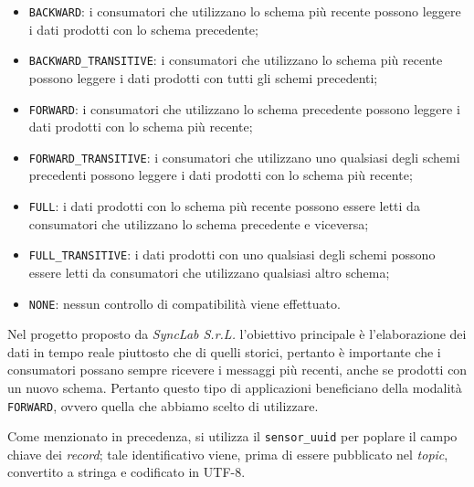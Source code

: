 \begin{itemize}
	\item \texttt{BACKWARD}: i consumatori che utilizzano lo schema più recente possono leggere i dati prodotti con lo schema precedente;
	\item \texttt{BACKWARD\_TRANSITIVE}: i consumatori che utilizzano lo schema più recente possono leggere i dati prodotti con tutti gli schemi precedenti;
	\item \texttt{FORWARD}: i consumatori che utilizzano lo schema precedente possono leggere i dati prodotti con lo schema più recente;
	\item \texttt{FORWARD\_TRANSITIVE}: i consumatori che utilizzano uno qualsiasi degli schemi precedenti possono leggere i dati prodotti con lo schema più recente;
	\item \texttt{FULL}: i dati prodotti con lo schema più recente possono essere letti da consumatori che utilizzano lo schema precedente e viceversa;
	\item \texttt{FULL\_TRANSITIVE}: i dati prodotti con uno qualsiasi degli schemi possono essere letti da consumatori che utilizzano qualsiasi altro schema;
	\item \texttt{NONE}: nessun controllo di compatibilità viene effettuato.
\end{itemize}
Nel progetto proposto da \textit{SyncLab S.r.L.} l'obiettivo principale è l'elaborazione dei dati in tempo reale piuttosto che di quelli storici, pertanto
è importante che i consumatori possano sempre ricevere i messaggi più recenti, anche se prodotti con un nuovo schema. Pertanto questo tipo di applicazioni beneficiano
della modalità \texttt{FORWARD}, ovvero quella che abbiamo scelto di utilizzare.

Come menzionato in precedenza, si utilizza il \texttt{sensor\_uuid} per poplare il campo chiave dei \textit{record}; tale identificativo viene, prima di essere pubblicato
nel \textit{topic}, convertito a stringa e codificato in UTF-8.

